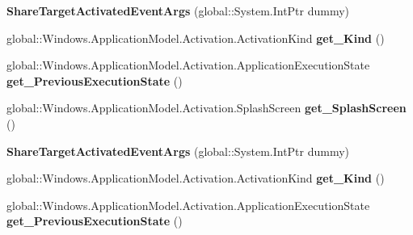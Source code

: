 \begin{DoxyCompactItemize}
{\bfseries Share\+Target\+Activated\+Event\+Args} (global\+::\+System.\+Int\+Ptr dummy)
\item 
\mbox{\label{class_windows_1_1_application_model_1_1_activation_1_1_share_target_activated_event_args_a6f63726ec764ab6a3e1fec6b977f8dc5}} 
global\+::\+Windows.\+Application\+Model.\+Activation.\+Activation\+Kind {\bfseries get\+\_\+\+Kind} ()
\item 
\mbox{\label{class_windows_1_1_application_model_1_1_activation_1_1_share_target_activated_event_args_a64b106b72efc80cb3b89078a4207e3b0}} 
global\+::\+Windows.\+Application\+Model.\+Activation.\+Application\+Execution\+State {\bfseries get\+\_\+\+Previous\+Execution\+State} ()
\item 
\mbox{\label{class_windows_1_1_application_model_1_1_activation_1_1_share_target_activated_event_args_a1c84d9d210a87e6279fce1cea17244e2}} 
global\+::\+Windows.\+Application\+Model.\+Activation.\+Splash\+Screen {\bfseries get\+\_\+\+Splash\+Screen} ()
\item 
\mbox{\label{class_windows_1_1_application_model_1_1_activation_1_1_share_target_activated_event_args_ac8dc2977a1b7387b5174d423f0f358ff}} 
{\bfseries Share\+Target\+Activated\+Event\+Args} (global\+::\+System.\+Int\+Ptr dummy)
\item 
\mbox{\label{class_windows_1_1_application_model_1_1_activation_1_1_share_target_activated_event_args_a6f63726ec764ab6a3e1fec6b977f8dc5}} 
global\+::\+Windows.\+Application\+Model.\+Activation.\+Activation\+Kind {\bfseries get\+\_\+\+Kind} ()
\item 
\mbox{\label{class_windows_1_1_application_model_1_1_activation_1_1_share_target_activated_event_args_a64b106b72efc80cb3b89078a4207e3b0}} 
global\+::\+Windows.\+Application\+Model.\+Activation.\+Application\+Execution\+State {\bfseries get\+\_\+\+Previous\+Execution\+State} ()

\end{DoxyCompactItemize}
